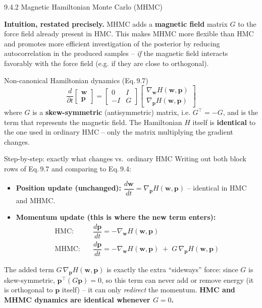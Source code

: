 \documentclass[aspectratio=169,10pt]{beamer}
\newcommand{\vw}{\mathbf{w}}
\newcommand{\vp}{\mathbf{p}}
\begin{document}
\begin{frame}[allowframebreaks]{9.4.2 Magnetic Hamiltonian Monte Carlo (MHMC)}

\textbf{Intuition, restated precisely.} MHMC adds a \textbf{magnetic field}
matrix $G$ to the force field already present in HMC. This makes MHMC more
flexible than HMC and promotes more efficient investigation of the
posterior by reducing autocorrelation in the produced samples -- \emph{if}
the magnetic field interacts favorably with the force field (e.g. if they
are close to orthogonal).

\begin{block}{Non-canonical Hamiltonian dynamics (Eq.\,9.7)}
$$ \frac{d}{\partial t}\begin{bmatrix}\vw\\ \vp\end{bmatrix}
   = \begin{bmatrix} 0 & I \\ -I & G\end{bmatrix}
     \begin{bmatrix}\nabla_{\vw} H(\vw,\vp)\\ \nabla_{\vp} H(\vw,\vp)\end{bmatrix} $$
where $G$ is a \textbf{skew-symmetric} (antisymmetric) matrix, i.e.
$G^{\!\top} = -G$, and is the term that represents the magnetic field. The
Hamiltonian $H$ itself is \textbf{identical} to the one used in ordinary
HMC -- only the matrix multiplying the gradient changes.
\end{block}

\framebreak

\begin{block}{Step-by-step: exactly what changes vs.\ ordinary HMC}
Writing out both block rows of Eq.\,9.7 and comparing to Eq.\,9.4:
\begin{itemize}
  \item \textbf{Position update (unchanged):}
  $\dfrac{d\vw}{dt} = \nabla_{\vp} H(\vw,\vp)$ -- identical in HMC and MHMC.
  \item \textbf{Momentum update (this is where the new term enters):}
  \begin{align*}
    \text{HMC:}  &\quad \dfrac{d\vp}{dt} = -\nabla_{\vw} H(\vw,\vp) \\
    \text{MHMC:} &\quad \dfrac{d\vp}{dt} = -\nabla_{\vw} H(\vw,\vp) \; + \; G\,\nabla_{\vp} H(\vw,\vp)
  \end{align*}
\end{itemize}
The added term $G\,\nabla_{\vp} H(\vw,\vp)$ is exactly the extra
``sideways'' force: since $G$ is skew-symmetric, $\vp^{\!\top}(G\vp) = 0$,
so this term can never add or remove energy (it is orthogonal to $\vp$
itself) -- it can only \emph{redirect} the momentum. \textbf{HMC and MHMC
dynamics are identical whenever $G = 0$.}
\end{block}


\end{frame}
\end{document}
